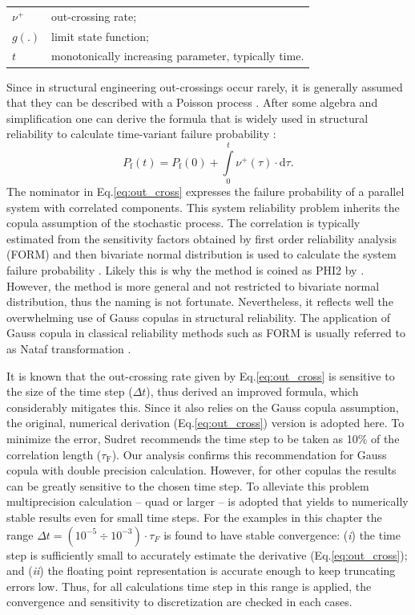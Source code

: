 \begin{tabular}{ll}
	$\nu ^+$ & out-crossing rate; \\
	$g(.)$ & limit state function; \\
	$t$ & monotonically increasing parameter, typically time.
\end{tabular} \medskip

\noindent
Since in structural engineering out-crossings occur rarely, it is generally assumed that they can be described with a Poisson process \citep{Cramer1967}. After some algebra and simplification one can derive the formula that is widely used in structural reliability to calculate time-variant failure probability \citep{Melchers2002}:
\begin{equation}
\label{eq:P_f_t}
	{P_{\mathrm{f}}}(t) = {P_{\mathrm{f}}}(0) + \int\limits_0^t {{\nu ^ + }(\tau )}  \cdot {\mathrm{d}}\tau.
\end{equation}
The nominator in Eq.\ref{eq:out_cross} expresses the failure probability of a parallel system with correlated components. This system reliability problem inherits the copula assumption of the stochastic process. The correlation is typically estimated from the sensitivity factors obtained by first order reliability analysis (FORM) and then bivariate normal distribution is used to calculate the system failure probability \citep{Renaud2004}. Likely this is why the method is coined as PHI2 by \citet{Renaud2002}. However, the method is more general and not restricted to bivariate normal distribution, thus the naming is not fortunate. Nevertheless, it reflects well the overwhelming use of Gauss copulas in structural reliability. The application of Gauss copula in classical reliability methods such as FORM is usually referred to as Nataf transformation \citep{Liu1986, Nataf1962}.

It is known that the out-crossing rate given by Eq.\ref{eq:out_cross} is sensitive to the size of the time step ($\Delta t$), thus \citet{Sudret2008anal} derived an improved formula, which considerably mitigates this. Since it also relies on the Gauss copula assumption, the original, numerical derivation (Eq.\ref{eq:out_cross}) version is adopted here. To minimize the error, Sudret recommends the time step to be taken as 10\% of the correlation length ($\tau_\mathrm{F}$). Our analysis confirms this recommendation for Gauss copula with double precision calculation. However, for other copulas the results can be greatly sensitive to the chosen time step. To alleviate this problem multiprecision calculation -- quad or larger \citep{mct2016}  -- is adopted that yields to numerically stable results even for small time steps. For the examples in this chapter the range $\Delta t = \left( {{{10}^{ - 5}} \div {{10}^{ - 3}}} \right) \cdot {\tau _F}$  is found to have stable convergence: (\textit{i}) the time step is sufficiently small to accurately estimate the derivative (Eq.\ref{eq:out_cross}); and (\textit{ii}) the floating point representation is accurate enough to keep truncating errors low. Thus, for all calculations time step in this range is applied, the convergence and sensitivity to discretization are checked in each cases.

